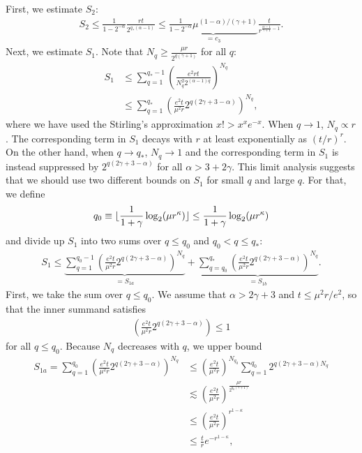 First, we estimate $S_2$:
\begin{align}
S_2 \leq \frac{1}{1-2^{-\alpha}}\frac{rt}{2^{q_*(\alpha-1)}}
\leq \underbrace{\frac{1}{1-2^{-\alpha}} \mu^{(1-\alpha)/(\gamma+1)} }_{=c_3}\frac{t}{r^{\frac{\alpha-1}{\gamma+1}-1}}.
\end{align}
Next, we estimate $S_1$.
Note that $N_q\geq \frac{\mu r}{2^{q(\gamma+1)}}$ for all $q$:
\begin{align}
S_1
&\leq \sum_{q=1}^{q_*-1}\left(\frac{e^2rt}{N^2_q 2^{(\alpha-1) q}}\right)^{N_q}\\
&\leq\sum_{q=1}^{q_*}\left(\frac{e^2t}{\mu^2 r}2^{q(2\gamma+3-\alpha)}\right)
^{N_q},\label{eq:boundonS1}
\end{align}
where we have used the Stirling's approximation $x!>x^xe^{-x}$.
When $q\rightarrow 1$, $N_q \propto r$.
The corresponding term in $S_1$ decays with $r$ at least exponentially as $(t/r)^r$.
On the other hand, when $q\rightarrow q_*$, $N_q \rightarrow 1$ and the corresponding term in $S_1$ is instead suppressed by $2^{q(2\gamma+3-\alpha)}$ for all $\alpha>3+2\gamma$.
This limit analysis suggests that we should use two different bounds on $S_1$ for small $q$ and large $q$.
For that, we define
\begin{align}
	q_0 \equiv \lfloor\frac{1}{1+\gamma}\log_2(\mu r^\kappa)\rfloor \le \frac{1}{1+\gamma}\log_2(\mu r^\kappa)
\end{align}
and divide up $S_1$ into two sums over $q\le q_0$ and $q_0 < q \le q_*$:
\begin{align}
	S_1 \leq \underbrace{\sum_{q=1}^{q_0-1}\left(\frac{e^2t}{\mu^2 r}2^{q(2\gamma+3-\alpha)}\right)^{N_q}}_{=S_{1a}} + \underbrace{\sum_{q=q_0}^{q_*}\left(\frac{e^2t}{\mu^2 r}2^{q(2\gamma+3-\alpha)}\right)^{N_q}}_{=S_{1b}}.
\end{align}
First, we take the sum over $q \le q_0$. We assume that $\alpha > 2\gamma+3$ and $t\le \mu^2r/e^2$, so that the inner summand satisfies
\begin{align}
	\left(\frac{e^2t}{\mu^2 r}2^{q(2\gamma+3-\alpha)}\right) \le 1
\end{align}
for all $q\le q_0$. Because $N_q$ decreases with $q$, we upper bound
\begin{align}
	S_{1a}
	= \sum_{q=1}^{q_0}\left(\frac{e^2t}{\mu^2 r}2^{q(2\gamma+3-\alpha)}\right)^{N_q}
	&\le \left(\frac{e^2t}{\mu^2 r}\right)^{N_{q_0}} \sum_{q=1}^{q_0}2^{q(2\gamma+3-\alpha)N_q } \\
		&\lesssim \left(\frac{e^2t}{\mu^2 r}\right)^\frac{\mu r}{2^{q_0(\gamma+1)}}\\
		&\le \left(\frac{e^2t}{\mu^2 r}\right)^{r^{1-\kappa}}\\
		&\le \frac t r e^{-r^{1-\kappa}},
\end{align}
